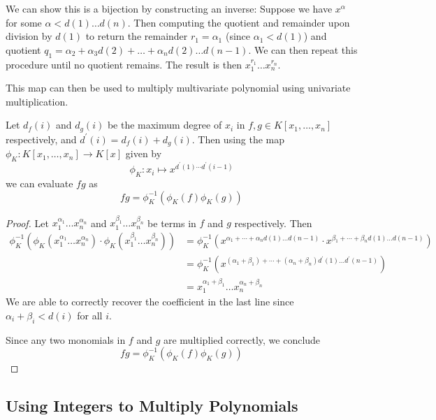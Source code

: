 We can show this is a bijection by constructing an inverse: Suppose we have $x^\alpha$ for some $\alpha < d(1)\ldots d(n)$. Then computing the quotient and remainder upon division by $d(1)$ to return the remainder $r_1 = \alpha_1$ (since $\alpha_1 < d(1)$) and quotient $q_1 = \alpha_2 + \alpha_3 d(2) + \ldots + \alpha_n d(2) \ldots d(n-1)$. We can then repeat this procedure until no quotient remains. The result is then $x_1^{r_1} \ldots x_n^{r_n}$.

This map can then be used to multiply multivariate polynomial using univariate multiplication.

\begin{proposition}
    Let $d_f(i)$ and $d_g(i)$ be the maximum degree of $x_i$ in $f, g \in K[x_1, \ldots, x_n]$ respectively, and $d^\prime(i) = d_f(i) + d_g(i)$. Then using the map $\phi_K: K[x_1, \ldots, x_n] \to K[x]$ given by
    \[
        \phi_K: x_i \mapsto x^{d^\prime(1) \cdots d^\prime(i-1)}
    \]
    we can evaluate $fg$ as
    \[
        f g= \phi^{-1}_K(\phi_K(f) \phi_K(g))
    \]
\end{proposition}

\begin{proof}
    Let $x_1^{\alpha_1}\ldots x_n^{\alpha_n}$ and $x_1^{\beta_1}\ldots x_n^{\beta_n}$ be terms in $f$ and $g$ respectively. Then
    \begin{align*}
        \phi_K^{-1}(\phi_K(x_1^{\alpha_1}\ldots x_n^{\alpha_n}) \cdot \phi_K(x_1^{\beta_1}\ldots x_n^{\beta_n})) &= \phi_K^{-1}(x^{\alpha_1 + \cdots  + \alpha_n d(1) \ldots d(n-1)} \cdot x^{\beta_1 + \cdots + \beta_n d(1) \ldots d(n-1)})\\
                                                                                                                 &= \phi_K^{-1}(x^{(\alpha_1 + \beta_1) + \cdots + (\alpha_n + \beta_n)d^\prime(1) \ldots d^\prime(n-1)})\\
        &= x_1^{\alpha_1 + \beta_1} \ldots x_n^{\alpha_n + \beta_n}
    \end{align*}
    We are able to correctly recover the coefficient in the last line since $\alpha_i + \beta_i < d(i)$ for all $i$.

    Since any two monomials in $f$ and $g$ are multiplied correctly, we conclude
    \[
        f g= \phi^{-1}_K(\phi_K(f) \phi_K(g))
    \]
\end{proof}

\medskip

\subsection{Using Integers to Multiply Polynomials}%
\label{sub:Using Integers to multiply Polynomials}

